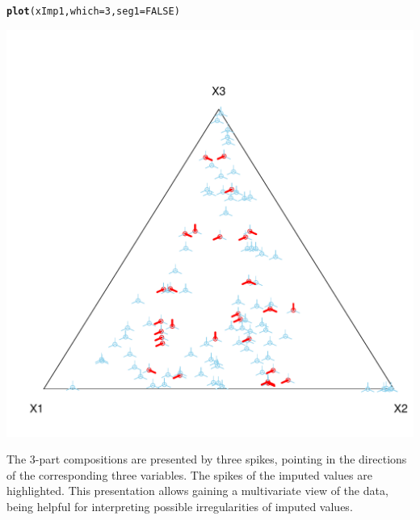 \documentclass{scrartcl}\usepackage[]{graphicx}\usepackage[]{color}
\makeatletter
\def\maxwidth{ %
  \ifdim\Gin@nat@width>\linewidth
    \linewidth
  \else
    \Gin@nat@width
  \fi
}
\newcommand{\hlnum}[1]{\textcolor[rgb]{0.686,0.059,0.569}{#1}}%
\newcommand{\hlstd}[1]{\textcolor[rgb]{0.345,0.345,0.345}{#1}}%
\newcommand{\hlkwc}[1]{\textcolor[rgb]{0.333,0.667,0.333}{#1}}%
\newcommand{\hlkwd}[1]{\textcolor[rgb]{0.737,0.353,0.396}{\textbf{#1}}}%
\newenvironment{kframe}{%
 \def\at@end@of@kframe{}%
 \ifinner\ifhmode%
  \def\at@end@of@kframe{\end{minipage}}%
  \begin{minipage}{\columnwidth}%
 \fi\fi%
 \def\FrameCommand##1{\hskip\@totalleftmargin \hskip-\fboxsep
 \colorbox{shadecolor}{##1}\hskip-\fboxsep
     \hskip-\linewidth \hskip-\@totalleftmargin \hskip\columnwidth}%
 \MakeFramed {\advance\hsize-\width
   \@totalleftmargin\z@ \linewidth\hsize
   \@setminipage}}%
 {\par\unskip\endMakeFramed%
 \at@end@of@kframe}
\newenvironment{knitrout}{}{} %
\makeatother
\begin{document}
\begin{knitrout}
\color{fgcolor}\begin{kframe}
\begin{alltt}
\hlkwd{plot}\hlstd{(xImp1,} \hlkwc{which}\hlstd{=}\hlnum{3}\hlstd{,} \hlkwc{seg1}\hlstd{=}\hlnum{FALSE}\hlstd{)}
\end{alltt}
\end{kframe}
\includegraphics[width=\maxwidth]{figure/unnamed-chunk-6-1} 

\end{knitrout}

The 3-part compositions are presented by three spikes, pointing in the
 directions of the corresponding three variables. The spikes of
 the imputed values are highlighted. This presentation allows gaining a multivariate
 view of the data, being helpful for interpreting possible irregularities
 of imputed values.

\end{document}
